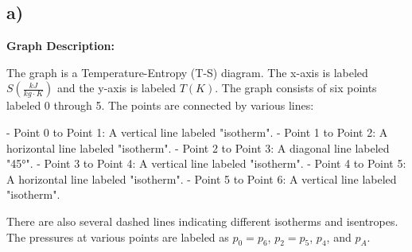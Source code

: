

\subsection*{a)}

\begin{center}
\textbf{Graph Description:}

The graph is a Temperature-Entropy (T-S) diagram. The x-axis is labeled $S \left(\frac{kJ}{kg \cdot K}\right)$ and the y-axis is labeled $T (K)$. The graph consists of six points labeled 0 through 5. The points are connected by various lines:

- Point 0 to Point 1: A vertical line labeled "isotherm".
- Point 1 to Point 2: A horizontal line labeled "isotherm".
- Point 2 to Point 3: A diagonal line labeled "45°".
- Point 3 to Point 4: A vertical line labeled "isotherm".
- Point 4 to Point 5: A horizontal line labeled "isotherm".
- Point 5 to Point 6: A vertical line labeled "isotherm".

There are also several dashed lines indicating different isotherms and isentropes. The pressures at various points are labeled as $p_0 = p_6$, $p_2 = p_5$, $p_4$, and $p_A$.

\end{center}